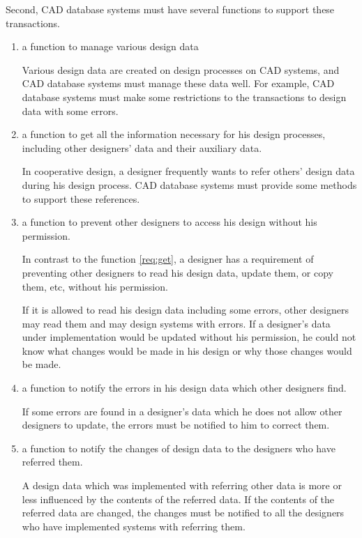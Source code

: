 Second, CAD database systems must have several 
functions to support these transactions.
\begin{enumerate}
 \item{\label{req:manage}} a function to manage various design data

Various design data are created on design processes on CAD systems, and
CAD database systems must manage these data well.
For example, CAD database systems must make some restrictions to the
transactions to design data with some errors.

 \item{\label{req:get}} a function to get all 
the information necessary for his design processes, including other 
designers' data and their auxiliary data.

In cooperative design, a designer frequently wants to refer others'
design data during his design process.
CAD database systems must provide some methods to support these
references.

 \item{\label{req:prevent}} a function to prevent other designers to 
access his design without his permission.

In contrast to the function \ref{req:get}, a designer has a requirement
of preventing other designers to read his design data, update them, or
copy them, etc, without his permission.

If it is allowed to read his design data including some errors, other
designers may read them and may design systems with errors.
If a designer's data under implementation would be updated without his
permission, he could not know what changes would be made in his design
or why those changes would be made.

 \item{\label{req:errornotify}} a function to notify the errors in his 
design data which other designers find.

If some errors are found in a designer's data which he does not allow
other designers to update, the errors must be notified to him to correct
them.

 \item{\label{req:changenotify}} a function to notify the changes of 
design data to the designers who have referred them.

A design data which was implemented with referring other data is
more or less influenced by the contents of the referred data.
If the contents of the referred data are changed, the changes must be 
notified to all the designers who have implemented systems with 
referring them.
\end{enumerate}

